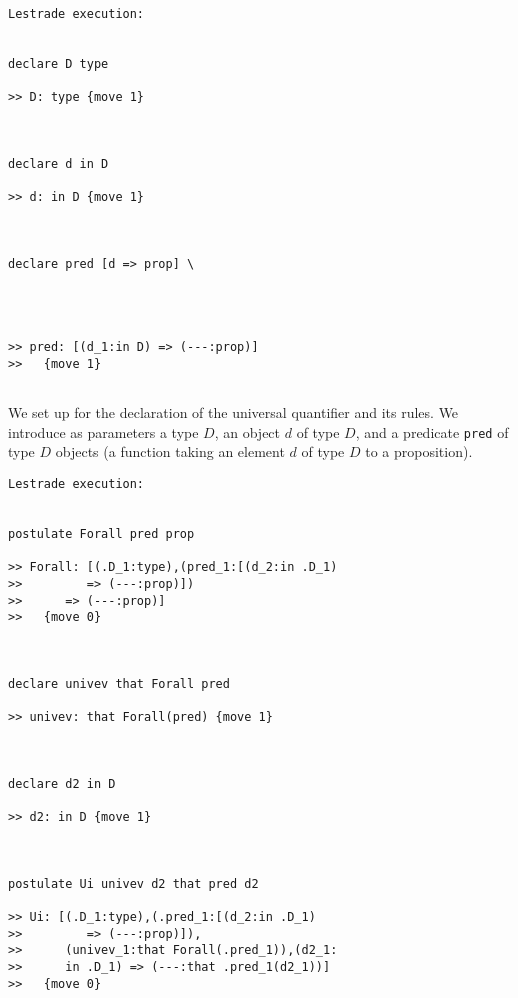 \documentclass{slides}
\begin{document}
\begin{slide}
{\small
\begin{verbatim}Lestrade execution:


declare D type

>> D: type {move 1}



declare d in D

>> d: in D {move 1}



declare pred [d => prop] \
   



>> pred: [(d_1:in D) => (---:prop)]
>>   {move 1}


\end{verbatim}
}

\end{slide}

\begin{slide}

We set up for the declaration of the universal quantifier and its rules.  We introduce as parameters a type $D$, an object $d$ of type $D$, and a predicate {\tt pred} of type $D$ objects
(a function taking an element $d$ of type $D$ to a proposition).

\end{slide}

\begin{slide}
{\tiny
\begin{verbatim}Lestrade execution:


postulate Forall pred prop

>> Forall: [(.D_1:type),(pred_1:[(d_2:in .D_1)
>>         => (---:prop)])
>>      => (---:prop)]
>>   {move 0}



declare univev that Forall pred

>> univev: that Forall(pred) {move 1}



declare d2 in D

>> d2: in D {move 1}



postulate Ui univev d2 that pred d2

>> Ui: [(.D_1:type),(.pred_1:[(d_2:in .D_1)
>>         => (---:prop)]),
>>      (univev_1:that Forall(.pred_1)),(d2_1:
>>      in .D_1) => (---:that .pred_1(d2_1))]
>>   {move 0}


\end{verbatim}

}

\end{slide}
\end{document}
